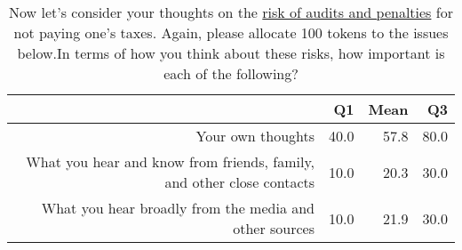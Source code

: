 \documentclass{NSF_proposal_mod}
\begin{document}
\begin{table}[ht]
\centering
\begin{tabular}{rrrr}
  \hline
 & Q1 & Mean & Q3 \\ 
  \hline
	Your own thoughts & 40.0 & 57.8 & 80.0 \\ 
  What you hear and know from friends, family, and other close contacts & 10.0 & 20.3 & 30.0 \\ 
  What you hear broadly from the media and other sources & 10.0 & 21.9 & 30.0 \\ 
   \hline
\end{tabular}
\caption{Now let's consider your thoughts on the \underline{risk of audits and penalties} for not paying 
one's taxes.  Again, please allocate 100 tokens to the issues below.In terms of how you think about these
risks, how important is each of the following?} 
\end{table}
\end{document}
